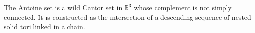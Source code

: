 The Antoine set is a wild Cantor set in $\mathbb{R}^3$ whose complement is not simply connected. It is constructed as the intersection of a descending sequence of nested solid tori linked in a chain.
